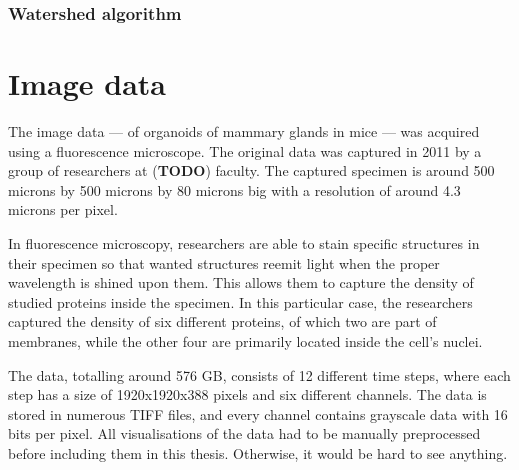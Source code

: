 \documentclass[
  digital,     %
  oneside,     %
  nosansbold,  %
  nocolorbold, %
  lof,         %
  lot,         %
]{fithesis4}
\begin{document}
\subsection{Watershed algorithm}

\chapter{Image data}

The image data --- of organoids of mammary glands in mice --- was acquired using
a fluorescence microscope. The original data was captured in 2011 by a group of
researchers at (\textbf{TODO}) faculty. The captured specimen is around 500
microns by 500 microns by 80 microns big with a resolution of around 4.3 microns
per pixel.

In fluorescence microscopy, researchers are able to stain specific structures in
their specimen so that wanted structures reemit light when the proper wavelength
is shined upon them. This allows them to capture the density of studied proteins
inside the specimen. In this particular case, the researchers captured the
density of six different proteins, of which two are part of membranes, while the
other four are primarily located inside the cell's nuclei.

The data, totalling around 576 GB, consists of 12 different time steps, where
each step has a size of 1920x1920x388 pixels and six different channels. The
data is stored in numerous TIFF files, and every channel contains grayscale data
with 16 bits per pixel. All visualisations of the data had to be manually
preprocessed before including them in this thesis. Otherwise, it would be hard
to see anything.
\end{document}

